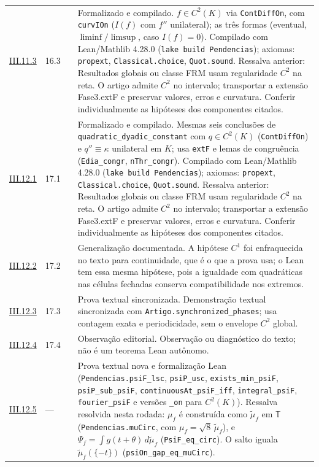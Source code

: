 \documentclass[12pt,a4paper]{article}
\theoremstyle{preciso}
\theoremstyle{definition}
\newcommand{\code}[1]{\nolinkurl{#1}}
\theoremstyle{preciso}
\theoremstyle{preciso}
\theoremstyle{preciso}
\theoremstyle{preciso}
\theoremstyle{definition}
\theoremstyle{preciso}
\theoremstyle{definition}
\theoremstyle{preciso}
\theoremstyle{preciso}
\theoremstyle{definition}
\begin{document}
\begin{singlespace}
\begin{longtable}{@{}p{.11\linewidth}p{.09\linewidth}p{.09\linewidth}p{.59\linewidth}@{}}
\hyperref[map:artigo_2:11.3]{III.11.3} & 16.3 & \pageref{map:artigo_2:11.3} & Formalizado e compilado. $f\in C^2(K)$ via \texttt{ContDiffOn}, com \texttt{curvIOn} ($I(f)$ com $f''$ unilateral); as três formas (eventual, $\liminf/\limsup$, caso $I(f)=0$). Compilado com Lean/Mathlib 4.28.0 (\texttt{lake build Pendencias}); axiomas: \texttt{propext}, \texttt{Classical.choice}, \texttt{Quot.sound}. Ressalva anterior: Resultados globais ou classe FRM usam regularidade $C^2$ na reta. O artigo admite $C^2$ no intervalo; transportar a extensão Fase3.extF e preservar valores, erros e curvatura. Conferir individualmente as hipóteses dos componentes citados.\\[4pt]
\hyperref[map:artigo_2:12.1]{III.12.1} & 17.1 & \pageref{map:artigo_2:12.1} & Formalizado e compilado. Mesmas seis conclusões de \texttt{quadratic\_dyadic\_constant} com $q\in C^2(K)$ (\texttt{ContDiffOn}) e $q''\equiv\kappa$ unilateral em $K$; usa \texttt{extF} e lemas de congruência (\texttt{Edia\_congr}, \texttt{nThr\_congr}). Compilado com Lean/Mathlib 4.28.0 (\texttt{lake build Pendencias}); axiomas: \texttt{propext}, \texttt{Classical.choice}, \texttt{Quot.sound}. Ressalva anterior: Resultados globais ou classe FRM usam regularidade $C^2$ na reta. O artigo admite $C^2$ no intervalo; transportar a extensão Fase3.extF e preservar valores, erros e curvatura. Conferir individualmente as hipóteses dos componentes citados.\\[4pt]
\hyperref[map:artigo_2:12.2]{III.12.2} & 17.2 & \pageref{map:artigo_2:12.2} & Generalização documentada. A hipótese $C^1$ foi enfraquecida no texto para continuidade, que é o que a prova usa; o Lean tem essa mesma hipótese, pois a igualdade com quadráticas nas células fechadas conserva compatibilidade nos extremos.\\[4pt]
\hyperref[map:artigo_2:12.3]{III.12.3} & 17.3 & \pageref{map:artigo_2:12.3} & Prova textual sincronizada. Demonstração textual sincronizada com \code{Artigo.synchronized_phases}; usa contagem exata e periodicidade, sem o envelope $C^2$ global.\\[4pt]
\hyperref[map:artigo_2:12.4]{III.12.4} & 17.4 & \pageref{map:artigo_2:12.4} & Observação editorial. Observação ou diagnóstico do texto; não é um teorema Lean autônomo.\\[4pt]
\hyperref[map:artigo_2:12.5]{III.12.5} & --- & \pageref{map:artigo_2:12.5} & Prova textual nova e formalização Lean (\texttt{Pendencias.psiF\_lsc}, \texttt{psiP\_usc}, \texttt{exists\_min\_psiF}, \texttt{psiP\_sub\_psiF}, \texttt{continuousAt\_psiF\_iff}, \texttt{integral\_psiF}, \texttt{fourier\_psiF} e versões \texttt{\_on} para $C^2(K)$). Ressalva resolvida nesta rodada: $\mu_f$ é construída como $\tilde\mu_f$ em $\mathbb T$ (\texttt{Pendencias.muCirc}, com $\mu_f=\sqrt8\,\tilde\mu_f$), e $\Psi_f=\int g(t+\theta)\,d\tilde\mu_f$ (\texttt{PsiF\_eq\_circ}). O salto iguala $\tilde\mu_f(\{-t\})$ (\code{psiOn_gap_eq_muCirc}).\\[4pt]

\end{longtable}
\end{singlespace}
\end{document}
